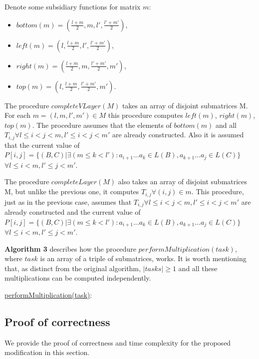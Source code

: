 \documentclass[runningheads]{llncs}
\begin{document}
Denote some subsidiary functions for matrix $m$:
 \begin{itemize}
  \item $bottom(m) = (\frac{l+m}{2}, m, l', \frac{l'+m'}{2})$,
  \item $left(m) = (l, \frac{l+m}{2}, l', \frac{l'+m'}{2})$,
  \item $right(m) = (\frac{l+m}{2}, m, \frac{l'+m'}{2}, m')$, 
  \item $top(m) = (l, \frac{l+m}{2}, \frac{l'+m'}{2}, m')$.
\end{itemize}
 
The procedure $completeVLayer(M)$ takes an array of disjoint submatrices M. For each $m = (l, m, l', m') \in M$ this procedure computes $left(m)$, $right(m)$, $top(m)$. The procedure assumes that the elements of $bottom(m)$ and all $T_{i, j} \forall l \leq i < j < m,  l' \leq i < j < m'$ are already constructed. Also it is assumed that the current value of  $P[i, j] =  \{ (B, C) |\exists (m \le k < l'): a_{i + 1}...a_{k} \in L(B), a_{k + 1}...a_{j} \in L(C)\}$ $\forall l \leq i < m,  l' \leq j < m'$.
 
The procedure $completeLayer(M)$ also takes an array of disjoint submatrices M, but unlike the previous one, it computes $T_{i, j} \forall (i, j) \in m$. This procedure, just as in the previous case, assumes that  $T_{i, j} \forall l \leq i < j < m,  l' \leq i < j < m'$ are already constructed and the current value of  $P[i, j] =  \{ (B, C) |\exists (m \le k < l'): a_{i + 1}...a_{k} \in L(B), a_{k + 1}...a_{j} \in L(C)\}$ $\forall l \leq i < m,  l' \leq j < m'$.
 
\textbf{Algorithm 3} describes how the procedure $performMultiplication(task)$, where $task$ is an array of a triple of submatrices, works. It is worth mentioning that, as distinct from the original algorithm, $|tasks| \ge 1$ and all these multiplications can be computed independently.


\begin{algorithm}[h!]
\SetAlgoNoLine
\underline{performMultiplication(task)}{:}{\\
}
\caption{}
\end{algorithm}

\subsection{Proof of correctness}

We provide the proof of correctness and time complexity for the proposed modification in this section. 
\end{document}
